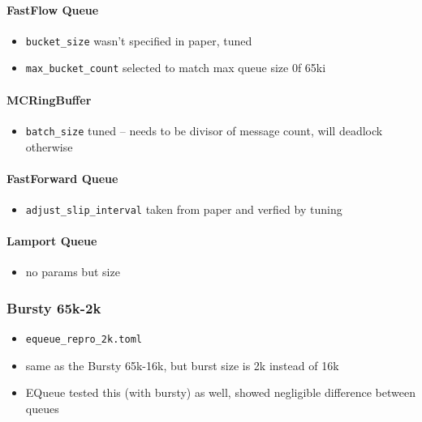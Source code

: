 \paragraph{FastFlow Queue}
\begin{itemize}
    \item \texttt{bucket\_size} wasn't specified in paper, tuned
    \item \texttt{max\_bucket\_count} selected to match max queue size 0f 65ki
\end{itemize}

\paragraph{MCRingBuffer}
\begin{itemize}
    \item \texttt{batch\_size} tuned -- needs to be divisor of message count, will deadlock otherwise
\end{itemize}

\paragraph{FastForward Queue}
\begin{itemize}
    \item \texttt{adjust\_slip\_interval} taken from paper and verfied by tuning
\end{itemize}

\paragraph{Lamport Queue}
\begin{itemize}
    \item no params but size
\end{itemize}

\subsubsection{Bursty 65k-2k}
\begin{itemize}
    \item \texttt{equeue\_repro\_2k.toml}
    \item same as the Bursty 65k-16k, but burst size is 2k instead of 16k
    \item EQueue tested this (with bursty) as well, showed negligible difference between queues
\end{itemize}

